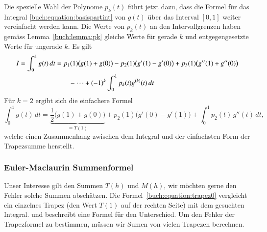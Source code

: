 Die spezielle Wahl der Polynome $p_k(t)$ führt jetzt dazu, dass die
Formel für das Integral \eqref{buch:equation:basispartint}
von $g(t)$ über das Interval $[0,1]$ weiter vereinfacht werden kann.
Die Werte von $p_k(t)$ an den Intervallgrenzen haben gemäss
Lemma~\ref{buch:lemma:pk} gleiche Werte für gerade $k$ und entgegengesetzte
Werte für ungerade $k$.
Es gilt
\begin{align}
I=\int_0^1g(t)\,dt
&=
p_1(1) \bigl(g(1)+g(0)\bigr)
-
p_2(1) \bigl(g'(1)-g'(0)\bigr)
+
p_3(1)  \bigl(g''(1)+g''(0)\bigr)
\notag
\\
&\qquad
-\dots
+(-1)^k\int_0^1 p_k(t)g^{(k)}(t)\,dt
\label{buch:equation:eulermaclaurin1}
\end{align}
Für $k=2$ ergibt sich die einfachere Formel
\begin{equation}
\int_0^1g(t)\,dt
=
\underbrace{
\frac12\bigl(g(1)+g(0)\bigr)
}_{\displaystyle = T(1)}
+
p_2(1) \bigl(g'(0)-g'(1)\bigr)
+
\int_0^1 p_2(t)\,g''(t)\,dt,
\label{buch:equation:trapez0}
\end{equation}
welche einen Zusammenhang zwischen dem Integral und der einfachsten Form
der Trapezsumme herstellt.

\subsubsection{Euler-Maclaurin Summenformel}
Unser Interesse gilt den Summen $T(h)$ und $M(h)$, wir möchten gerne den
Fehler solche Summen abschätzen.
Die Formel~\eqref{buch:equation:trapez0} vergleicht ein einzelnes Trapez
(den Wert $T(1)$ auf der rechten Seite) mit dem gesuchten Integral.
und beschreibt eine Formel für den Unterschied.
Um den Fehler der Trapezformel zu bestimmen, müssen wir Sumen von vielen
Trapezen berechnen.

